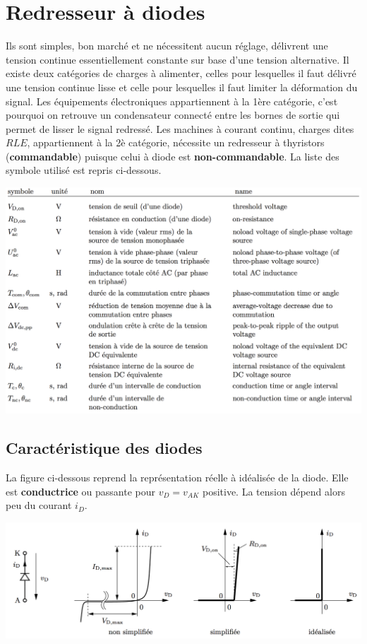 
\chapter{Redresseur à diodes}
	
	Ils sont simples, bon marché et ne nécessitent aucun réglage, délivrent une tension continue essentiellement constante sur base d'une tension alternative. Il existe deux catégories de charges à alimenter, celles pour lesquelles il faut délivré une tension continue lisse et celle pour lesquelles il faut limiter la déformation du signal. Les équipements électroniques appartiennent à la 1ère catégorie, c'est pourquoi on retrouve un condensateur connecté entre les bornes de sortie qui permet de lisser le signal redressé. Les machines à courant continu, charges dites $RLE$, appartiennent à la 2è catégorie, nécessite un redresseur à thyristors (\textbf{commandable}) puisque celui à diode est \textbf{non-commandable}. La liste des symbole utilisé est repris ci-dessous.
	
	\begin{center}
	\includegraphics[scale=0.45]{ch2/1}
	\end{center}
	\newpage
	
	\section{Caractéristique des diodes}
		La figure ci-dessous reprend la représentation réelle à idéalisée de la diode. Elle est \textbf{conductrice} ou passante pour $v_D=v_{AK}$ positive. La tension dépend alors peu du courant $i_D$. 
		
		\begin{center}
		\includegraphics[scale=0.45]{ch2/2}
		\end{center}			
		
